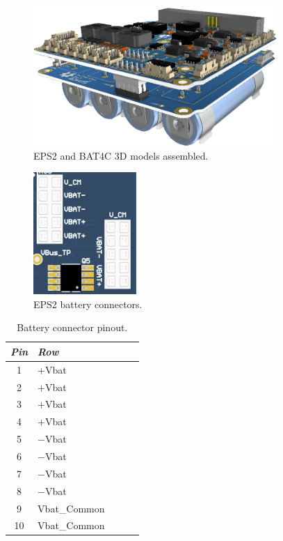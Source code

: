 \begin{figure}[!ht]
    \begin{center}
        \includegraphics[width=93mm]{figures/eps2-pcb-3d-battery.png}
        \caption{EPS2 and BAT4C 3D models assembled.}
        \label{fig:eps2-pcb-3d-battery}
    \end{center}
\end{figure}

\begin{figure}[!ht]
    \begin{center}
        \includegraphics[width=0.35\textwidth]{figures/battery-connector.png}
        \caption{EPS2 battery connectors.}
        \label{fig:battery-connector}
    \end{center}
\end{figure}

\begin{table}[!h]
    \centering
    \begin{tabular}{cllll}
        \toprule[1.5pt]
        \textit{Pin} & \textit{Row} \\
        \midrule
        1            & $+$Vbat \\
        2            & $+$Vbat \\
        3            & $+$Vbat \\
        4            & $+$Vbat \\
        5            & $-$Vbat \\
        6            & $-$Vbat \\
        7            & $-$Vbat \\
        8            & $-$Vbat \\
        9            & Vbat\_Common \\
        10           & Vbat\_Common \\
        \bottomrule[1.5pt]
    \end{tabular}
    \caption{Battery connector pinout.}
    \label{tab:battery-connector}
\end{table}

